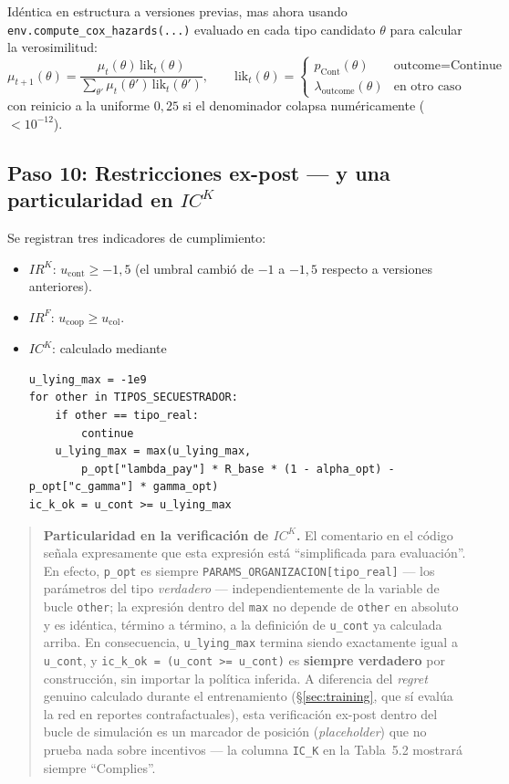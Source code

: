 \documentclass[ecta,nameyear,draft]{econsocart}
\newcommand{\pyvar}[1]{\texttt{#1}}
\begin{document}
Idéntica en estructura a versiones previas, mas ahora usando
\pyvar{env.compute\_cox\_hazards(...)} evaluado en cada tipo candidato $\theta$ para calcular
la verosimilitud:
\begin{equation}
\mu_{t+1}(\theta) = \frac{\mu_t(\theta)\,\mathrm{lik}_t(\theta)}{\sum_{\theta'}\mu_t(\theta')\,\mathrm{lik}_t(\theta')},
\qquad
\mathrm{lik}_t(\theta) = \begin{cases} p_{\mathrm{Cont}}(\theta) & \text{outcome}=\text{Continue} \\ \lambda_{\mathrm{outcome}}(\theta) & \text{en otro caso}\end{cases}
\end{equation}
con reinicio a la uniforme $0{,}25$ si el denominador colapsa numéricamente ($<10^{-12}$).

\subsection{Paso 10: Restricciones ex-post --- y una particularidad en $IC^K$}

Se registran tres indicadores de cumplimiento:
\begin{itemize}
\item $IR^K$: $u_{\mathrm{cont}} \geq -1{,}5$ (el umbral cambió de $-1$ a $-1{,}5$ respecto a
versiones anteriores).
\item $IR^F$: $u_{\mathrm{coop}} \geq u_{\mathrm{col}}$.
\item $IC^K$: calculado mediante
\begin{lstlisting}
u_lying_max = -1e9
for other in TIPOS_SECUESTRADOR:
    if other == tipo_real:
        continue
    u_lying_max = max(u_lying_max,
        p_opt["lambda_pay"] * R_base * (1 - alpha_opt) - p_opt["c_gamma"] * gamma_opt)
ic_k_ok = u_cont >= u_lying_max
\end{lstlisting}
\end{itemize}

\begin{quotation}
\noindent\textbf{Particularidad en la verificación de $IC^K$.} El comentario en el código
señala expresamente que esta expresión está ``simplificada para evaluación''. En efecto,
\pyvar{p\_opt} es siempre \pyvar{PARAMS\_ORGANIZACION[tipo\_real]} --- los parámetros del tipo
\emph{verdadero} --- independientemente de la variable de bucle \pyvar{other}; la expresión
dentro del \pyvar{max} no depende de \pyvar{other} en absoluto y es idéntica, término a
término, a la definición de \pyvar{u\_cont} ya calculada arriba. En consecuencia,
\pyvar{u\_lying\_max} termina siendo exactamente igual a \pyvar{u\_cont}, y
\pyvar{ic\_k\_ok = (u\_cont >= u\_cont)} es \textbf{siempre verdadero} por construcción, sin
importar la política inferida. A diferencia del \emph{regret} genuino calculado durante el
entrenamiento (\S\ref{sec:training}, que sí evalúa la red en reportes contrafactuales), esta
verificación ex-post dentro del bucle de simulación es un marcador de posición (\emph{placeholder})
que no prueba nada sobre incentivos --- la columna \pyvar{IC\_K} en la Tabla~5.2 mostrará
siempre ``Complies''.
\end{quotation}
\end{document}
